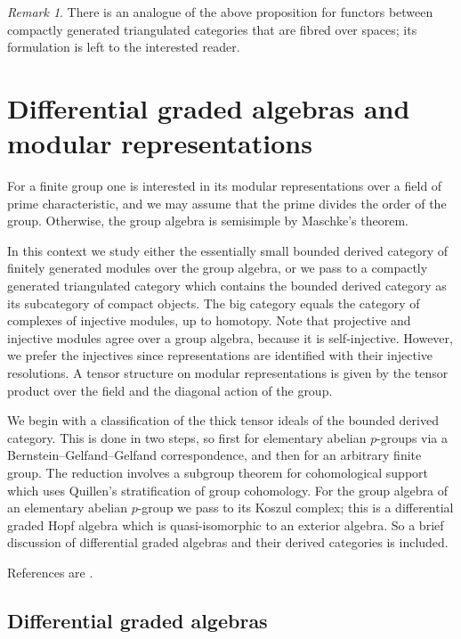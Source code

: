 \documentclass{amsart}[a4]
\theoremstyle{definition}
\theoremstyle{remark}
\newtheorem{remark}[theorem]{Remark}
\numberwithin{equation}{section}
\begin{document}
\begin{remark}
  There is an analogue of the above proposition for functors between
  compactly generated triangulated categories that are fibred over
  spaces; its formulation is left to the interested reader.
\end{remark}



\section{Differential graded algebras and modular representations}

For a finite group one is interested in its modular representations
over a field of prime characteristic, and we may assume that the prime
divides the order of the group. Otherwise, the group algebra is
semisimple by Maschke's theorem.

In this context we study either the essentially small bounded derived category of
finitely generated modules over the group algebra, or we pass to a
compactly generated triangulated category which contains the bounded derived
category as its subcategory of compact objects. The big category
equals the category of complexes of injective modules, up to homotopy.
Note that projective and injective modules agree over a group algebra,
because it is self-injective. However, we prefer the
injectives since representations are identified with their injective
resolutions. A tensor structure on modular representations is given by
the tensor product over the field and the diagonal action of the
group.

We begin with a classification of the thick tensor ideals of the
bounded derived category. This is done in two steps, so first for
elementary abelian $p$-groups via a Bernstein--Gelfand--Gelfand
correspondence, and then for an arbitrary finite group. The reduction
involves a subgroup theorem for cohomological support which uses
Quillen's stratification of group cohomology. For the group algebra of
an elementary abelian $p$-group we pass to its Koszul complex; this is
a differential graded Hopf algebra which is quasi-isomorphic to an
exterior algebra. So a brief discussion of differential graded
algebras and their derived categories is included.

References are
\cite{Benson/Iyengar/Krause:2011a,Benson/Iyengar/Krause:2011b,
Carlson:2000c,Carlson/Iyengar:2015a}.



\subsection*{Differential graded algebras}
\end{document}
